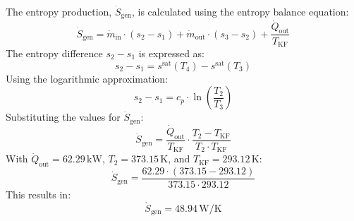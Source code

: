 The entropy production, \( \dot{S}_{\text{gen}} \), is calculated using the entropy balance equation:  
\[
\dot{S}_{\text{gen}} = \dot{m}_{\text{in}} \cdot (s_2 - s_1) + \dot{m}_{\text{out}} \cdot (s_3 - s_2) + \frac{\dot{Q}_{\text{out}}}{T_{\text{KF}}}
\]  
The entropy difference \( s_2 - s_1 \) is expressed as:  
\[
s_2 - s_1 = s^{\text{sat}}(T_4) - s^{\text{sat}}(T_3)
\]  
Using the logarithmic approximation:  
\[
s_2 - s_1 = c_p \cdot \ln \left( \frac{T_2}{T_3} \right)
\]  
Substituting the values for \( \dot{S}_{\text{gen}} \):  
\[
\dot{S}_{\text{gen}} = \frac{\dot{Q}_{\text{out}}}{T_{\text{KF}}} \cdot \frac{T_2 - T_{\text{KF}}}{T_2 \cdot T_{\text{KF}}}
\]  
With \( \dot{Q}_{\text{out}} = 62.29 \, \text{kW} \), \( T_2 = 373.15 \, \text{K} \), and \( T_{\text{KF}} = 293.12 \, \text{K} \):  
\[
\dot{S}_{\text{gen}} = \frac{62.29 \cdot (373.15 - 293.12)}{373.15 \cdot 293.12}
\]  
This results in:  
\[
\dot{S}_{\text{gen}} = 48.94 \, \text{W/K}
\]